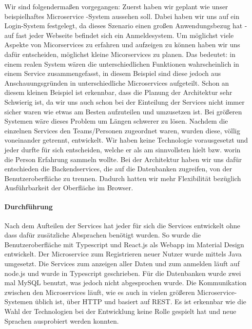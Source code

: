 Wir sind folgendermaßen vorgegangen: Zuerst haben wir geplant wie unser beispielhaftes Microservice -System aussehen soll. Dabei haben wir uns auf ein Login-System festgelegt, da dieses Szenario einen großen Anwendungsbezug hat - auf fast jeder Webseite befindet sich ein Anmeldesystem. \newline
Um möglichst viele Aspekte von Micorservices zu erfahren und aufzeigen zu können haben wir uns dafür entscheiden, möglichst kleine Micorservices zu planen. Das bedeutet: in einem realen System wären die unterschiedlichen Funktionen wahrscheinlich in einem Service zusammengefasst, in diesem Beispiel sind diese jedoch aus Anschauungsgründen in unterschiedliche Microservices aufgeteilt. \newline
Schon an diesem kleinen Beispiel ist erkennbar, dass die Planung der Architektur sehr Schwierig ist, da wir uns auch schon bei der Einteilung der Services nicht immer sicher waren wie etwas am Besten aufzuteilen und umzusetzen ist. Bei größeren Systemen wäre dieses Problem um Längen schwerer zu lösen. \newline
Nachdem die einzelnen Services den Teams/Personen zugeordnet waren, wurden diese, völlig voneinander getrennt, entwickelt. Wir haben keine Technologie vorausgesetzt und jeder durfte für sich entscheiden, welche er als am sinnvollsten hielt bzw. worin die Person Erfahrung sammeln wollte. \newline
Bei der Architektur haben wir uns dafür entschieden die Backendservices, die auf die Datenbanken zugreifen, von der Benutzeroberfläche zu trennen. Dadurch hatten wir mehr Flexibilität bezüglich Ausführbarkeit der Oberfläche im Browser.

\paragraph{Durchführung}
Nach dem Aufteilen der Services hat jeder für sich die Services entwickelt ohne dass dafür zusätzliche Absprachen benötigt wurden. So wurde die Benutzeroberfläche mit Typescript und React.js als Webapp im Material Design entwickelt. Der Microservice zum Registrieren neuer Nutzer wurde mittels Java umgesetzt. Die Services zum anzeigen aller Daten und zum anmelden läuft auf node.js und wurde in Typescript geschrieben. Für die Datenbanken wurde zwei mal MySQL benutzt, was jedoch nicht abgesprochen wurde. Die Kommunikation zwischen den Microservices läuft, wie es auch in vielen größeren Microservice-Systemen üblich ist, über HTTP und basiert auf REST. \newline
Es ist erkennbar wie die Wahl der Technologien bei der Entwicklung keine Rolle gespielt hat und neue Sprachen ausprobiert werden konnten.

